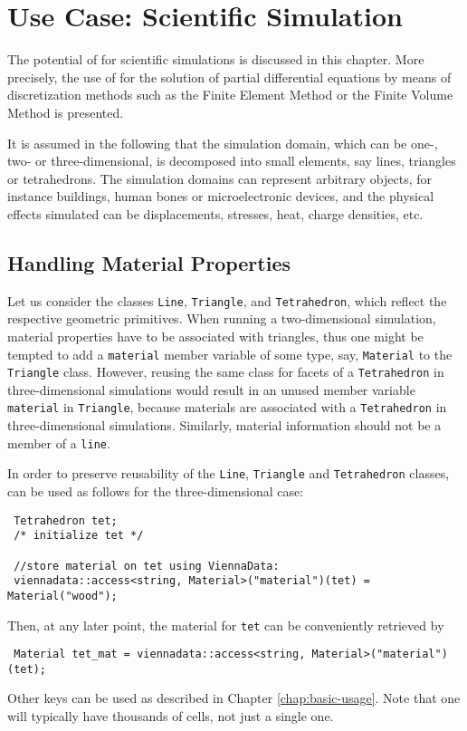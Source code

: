 \chapter{Use Case: Scientific Simulation} \label{chap:use-cases}



The potential of {\ViennaData} for scientific simulations is discussed in this chapter.
More precisely, the use of {\ViennaData} for the solution of partial differential equations by means of discretization methods such as the Finite Element Method or the Finite Volume Method is presented.

It is assumed in the following that the simulation domain, which can be one-, two- or three-dimensional, is decomposed into small elements, say lines, triangles or tetrahedrons. The simulation domains can represent arbitrary objects, for instance buildings, human bones or microelectronic devices, and the physical effects simulated can be displacements, stresses, heat, charge densities, etc.

\section{Handling Material Properties}
Let us consider the classes \lstinline|Line|, \lstinline|Triangle|, and \lstinline|Tetrahedron|, which reflect the respective geometric primitives.
When running a two-dimensional simulation, material properties have to be associated with triangles, thus one might be tempted to add a \lstinline|material| member variable of some type, say, \lstinline|Material| to the \lstinline|Triangle| class.
However, reusing the same class for facets of a \lstinline|Tetrahedron| in three-dimensional simulations would result in an unused
member variable \lstinline|material| in \lstinline|Triangle|, because materials are associated with a \lstinline|Tetrahedron| in three-dimensional simulations.
Similarly, material information should not be a member of a \lstinline|line|.

In order to preserve reusability of the \lstinline|Line|, \lstinline|Triangle| and \lstinline|Tetrahedron| classes, {\ViennaData} can be used as follows for the three-dimensional case:
\begin{lstlisting}
 Tetrahedron tet;
 /* initialize tet */

 //store material on tet using ViennaData:
 viennadata::access<string, Material>("material")(tet) = Material("wood");
\end{lstlisting}
Then, at any later point, the material for \lstinline|tet| can be conveniently retrieved by
\begin{lstlisting}
 Material tet_mat = viennadata::access<string, Material>("material")(tet);
\end{lstlisting}
Other keys can be used as described in Chapter \ref{chap:basic-usage}. Note that one will typically have thousands of cells, not just a single one.

